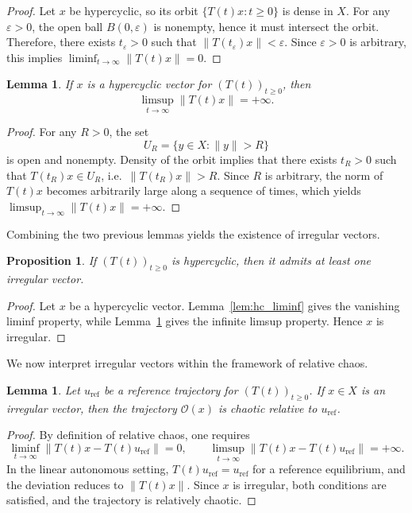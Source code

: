 \documentclass[12pt]{article}
\newtheorem{lemma}[theorem]{Lemma}
\newtheorem{proposition}[theorem]{Proposition}
\begin{document}
\begin{proof}
Let $x$ be hypercyclic, so its orbit $\{T(t)x:t\ge 0\}$ is dense in $X$. For any $\varepsilon>0$, the open ball $B(0,\varepsilon)$ is nonempty, hence it must intersect the orbit. Therefore, there exists $t_\varepsilon>0$ such that $\|T(t_\varepsilon)x\|<\varepsilon$. Since $\varepsilon>0$ is arbitrary, this implies $\liminf_{t\to\infty}\|T(t)x\|=0$.
\end{proof}

\begin{lemma}\label{lem:hc_limsup}
If $x$ is a hypercyclic vector for $(T(t))_{t\ge 0}$, then
\[
\limsup_{t\to\infty}\|T(t)x\|=+\infty.
\]
\end{lemma}

\begin{proof}
For any $R>0$, the set
\[
U_R=\{y\in X:\|y\|>R\}
\]
is open and nonempty. Density of the orbit implies that there exists
$t_R>0$ such that $T(t_R)x\in U_R$, i.e.\ $\|T(t_R)x\|>R$.
Since $R$ is arbitrary, the norm of $T(t)x$ becomes arbitrarily large along a sequence of times, which yields $\limsup_{t\to\infty}\|T(t)x\|=+\infty$.
\end{proof}

Combining the two previous lemmas yields the existence of irregular vectors.

\begin{proposition}\label{prop:irregular}
If $(T(t))_{t\ge 0}$ is hypercyclic, then it admits at least one irregular vector.
\end{proposition}

\begin{proof}
Let $x$ be a hypercyclic vector. Lemma~\ref{lem:hc_liminf} gives the vanishing
liminf property, while Lemma~\ref{lem:hc_limsup} gives the infinite limsup
property. Hence $x$ is irregular.
\end{proof}


We now interpret irregular vectors within the framework of relative chaos.

\begin{lemma}\label{lem:irregular_relative}
Let $u_{\mathrm{ref}}$ be a reference trajectory for $(T(t))_{t\ge 0}$. If $x\in X$ is an irregular vector, then the trajectory
$\mathcal{O}(x)$ is chaotic relative to $u_{\mathrm{ref}}$.
\end{lemma}

\begin{proof}
By definition of relative chaos, one requires
\[
\liminf_{t\to\infty}\|T(t)x-T(t)u_{\mathrm{ref}}\|=0,
\qquad
\limsup_{t\to\infty}\|T(t)x-T(t)u_{\mathrm{ref}}\|=+\infty.
\]
In the linear autonomous setting, $T(t)u_{\mathrm{ref}}=u_{\mathrm{ref}}$ for a reference equilibrium, and the deviation reduces to $\|T(t)x\|$. Since $x$ is irregular, both conditions are satisfied, and the trajectory is relatively chaotic.
\end{proof}
\end{document}
